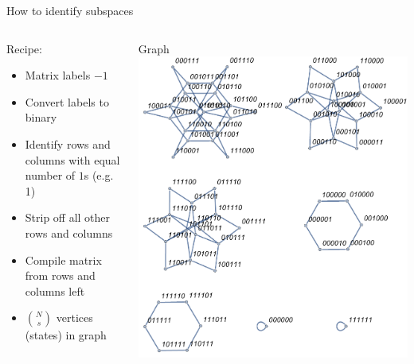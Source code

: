 \documentclass{beamer}
\begin{document}
\begin{frame}{How to identify subspaces}
	\begin{columns}[T]
		\begin{column}{0.5\textwidth}
			\centering
   			Recipe:
   			\begin{itemize}
   				\item Matrix labels $-1$
   				\item Convert labels to binary
   				\item Identify rows and columns with equal number of $1$s (e.g. 1)
   				\item Strip off all other rows and columns
   				\item Compile matrix from rows and columns left
   				\item ${N \choose s}$ vertices (states) in graph
   			\end{itemize}
   		\end{column}
		\begin{column}{0.5\textwidth}
			\centering
    		Graph
    		\includegraphics[trim=0 0 0 0mm, width=\textwidth]{Images/ring6_hamilton_graph3d_alt}
		\end{column}
	\end{columns}
\end{frame}
\end{document}
